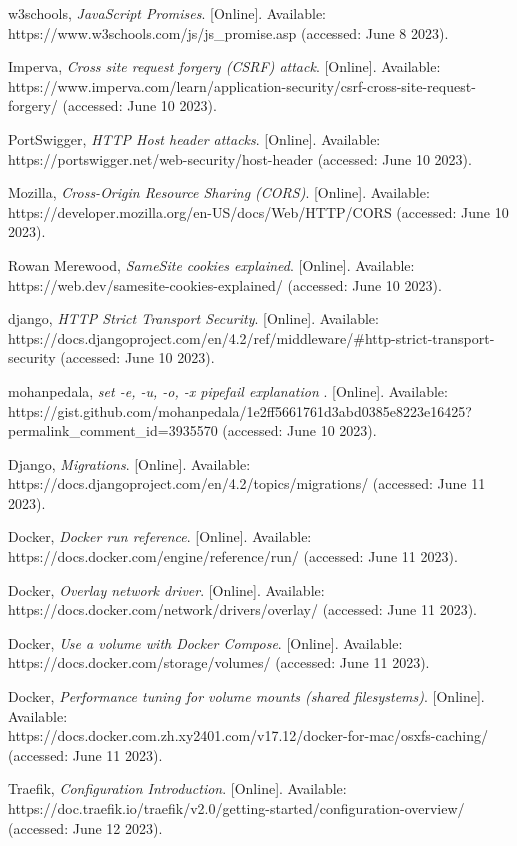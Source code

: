 \begin{referenceslist}
	\itemj w3schools, \emph{JavaScript Promises}. [Online]. Available: \\ 
	https://www.w3schools.com/js/js\_promise.asp (accessed: June 8 2023).
	
	\itemk Imperva, \emph{Cross site request forgery (CSRF) attack}. [Online]. Available: \\
	https://www.imperva.com/learn/application-security/csrf-cross-site-request-forgery/ (accessed: June 10 2023).
	
	\iteml PortSwigger, \emph{HTTP Host header attacks}. [Online]. Available: \\
	https://portswigger.net/web-security/host-header (accessed: June 10 2023).
	
	\itemm Mozilla, \emph{Cross-Origin Resource Sharing (CORS)}. [Online]. Available: \\
	https://developer.mozilla.org/en-US/docs/Web/HTTP/CORS (accessed: June 10 2023).
	
	\itemn Rowan Merewood, \emph{SameSite cookies explained}. [Online]. Available: \\
	https://web.dev/samesite-cookies-explained/ (accessed: June 10 2023).
	
	\itemo django, \emph{HTTP Strict Transport Security}. [Online]. Available: \\
	https://docs.djangoproject.com/en/4.2/ref/middleware/\#http-strict-transport-security (accessed: June 10 2023).
	
	\itemp mohanpedala, \emph{set -e, -u, -o, -x pipefail explanation }. [Online]. Available: \\
	https://gist.github.com/mohanpedala/1e2ff5661761d3abd0385e8223e16425? \\ permalink\_comment\_id=3935570 (accessed: June 10 2023).
	
	\itemq Django, \emph{Migrations}. [Online]. Available: \\
	https://docs.djangoproject.com/en/4.2/topics/migrations/  (accessed: June 11 2023).
	
	\itemr Docker, \emph{Docker run reference}. [Online]. Available: \\
	https://docs.docker.com/engine/reference/run/  (accessed: June 11 2023).
	
	\items Docker, \emph{Overlay network driver}. [Online]. Available: \\
	https://docs.docker.com/network/drivers/overlay/  (accessed: June 11 2023).
	
	\itemt Docker, \emph{Use a volume with Docker Compose}. [Online]. Available: \\
	https://docs.docker.com/storage/volumes/  (accessed: June 11 2023).
	
	\itemu Docker, \emph{Performance tuning for volume mounts (shared filesystems)}. [Online]. Available: \\
	https://docs.docker.com.zh.xy2401.com/v17.12/docker-for-mac/osxfs-caching/  (accessed: June 11 2023).
	
	\itemv Traefik, \emph{Configuration Introduction}. [Online]. Available: \\
	https://doc.traefik.io/traefik/v2.0/getting-started/configuration-overview/  (accessed: June 12 2023).
\end{referenceslist}
